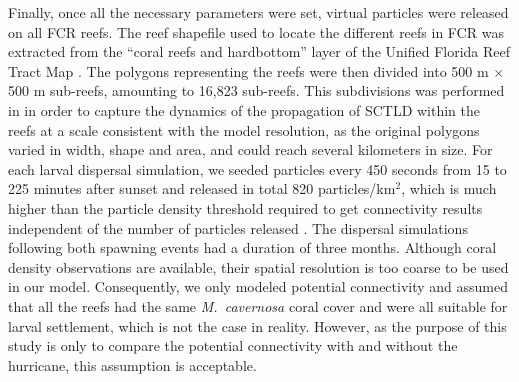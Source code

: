 \documentclass[fleqn,10pt]{wlscirep}
\newcommand{\modif}[1]{{#1}}
\begin{document}
Finally, once all the necessary parameters were set, virtual particles were released on all FCR reefs. The reef shapefile used to locate the different reefs in FCR was extracted from the “coral reefs and hardbottom” layer of the Unified Florida Reef Tract Map \citep{FWC2017Jan}. The polygons representing the reefs were then divided into 500 m $\times$ 500 m sub-reefs, amounting to 16,823 sub-reefs. \modif{This subdivisions was performed in \cite{DobbySCTLD} in order to capture the dynamics of the propagation of SCTLD within the reefs at a scale consistent with the model resolution, as the original polygons varied in width, shape and area, and could reach several kilometers in size}. For each larval dispersal simulation, we seeded particles every 450 seconds \modif{from 15 to 225 minutes} after sunset and released in total 820 particles/km$^{2}$, which is much higher than the particle density threshold required to get connectivity results independent of the number of particles released \citep{Monroy2017Jan}. The dispersal simulations following both spawning events had a duration of three months. \modif{Although coral density observations are available, their spatial resolution is too coarse to be used in our model. Consequently, we only modeled potential connectivity and assumed that all the reefs had the same \textit{M.~cavernosa} coral cover and were all suitable for larval settlement}, which is not the case in reality. However, as the purpose of this study is only to compare the \modif{potential} connectivity with and without the hurricane, this assumption is acceptable.
\end{document}
